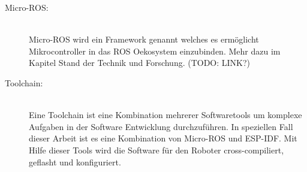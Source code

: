 \begin{flushleft}
\begin{description}
        \item[Micro-ROS:]\hfill\\
        Micro-ROS wird ein Framework genannt welches es ermöglicht Mikrocontroller in das ROS Oekosystem einzubinden.
        Mehr dazu im Kapitel Stand der Technik und Forschung. (TODO: LINK?)

        \item[Toolchain:] \hfill\\
        Eine Toolchain ist eine Kombination mehrerer Softwaretools um komplexe Aufgaben in der Software Entwicklung durchzuführen.
        In speziellen Fall dieser Arbeit ist es eine Kombination von Micro-ROS und ESP-IDF.
        Mit Hilfe dieser Tools wird die Software für den Roboter cross-compiliert, geflasht und konfiguriert. \cite{micro_ros}

        \end{description}
\end{flushleft}